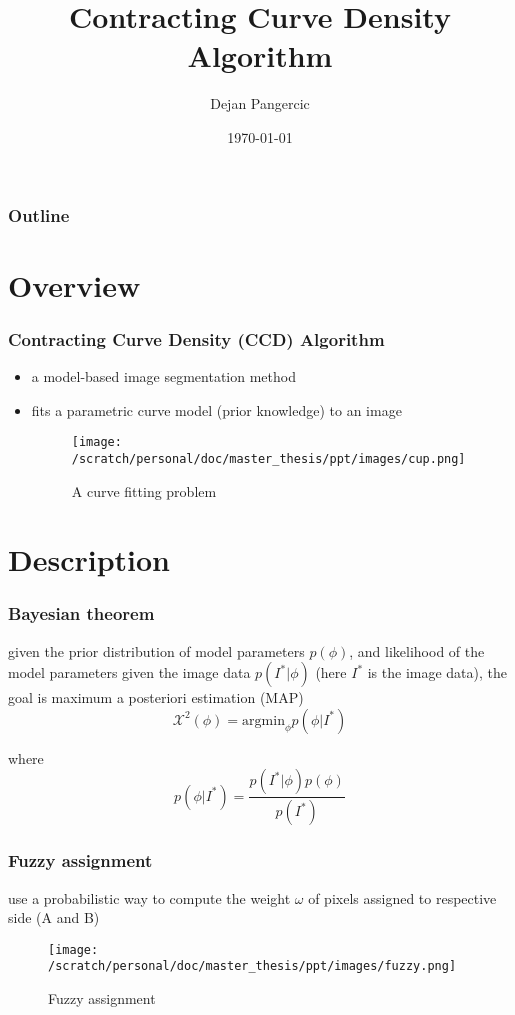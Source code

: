 \documentclass[english,10pt,presentation]{beamer}
\title{Contracting Curve Density Algorithm}
\author{Dejan Pangercic}
\date{\today}
\begin{document}
\maketitle

\begin{frame}
\frametitle{Outline}
\setcounter{tocdepth}{2}
\tableofcontents
\end{frame}

\section{Overview}
\label{sec-1}
\begin{frame}
\frametitle{Contracting Curve Density (CCD) Algorithm}
\label{sec-1_1}
\begin{itemize}

\item a model-based image segmentation method\\
\label{sec-1_1_1}%
\item fits a parametric curve model (prior knowledge) to an image\\
\label{sec-1_1_2}%
\begin{figure}[htb]
\centering
\texttt{[image: /scratch/personal/doc/master\_thesis/ppt/images/cup.png]}
\caption{\label{fig:1}A curve fitting problem}
\end{figure}

\end{itemize} %
\end{frame}
\section{Description}
\label{sec-2}
\begin{frame}
\frametitle{Bayesian theorem}
\label{sec-2_1}

    given the prior distribution of model parameters $p(\phi)$, and
    likelihood of the model parameters given the image data
    $p(I^*|\phi)$ (here $I^{*}$ is the image data), the goal is
    maximum a posteriori estimation (MAP)
\begin{displaymath}
\mathcal{X}^2(\phi) = \mathrm{argmin}_{\phi} p(\phi|I^*)
\end{displaymath}

where 
\begin{displaymath}
p(\phi|I^*) = \frac{p(I^*|\phi) p(\phi)}{p(I^{*})}
\end{displaymath}
\end{frame}
\begin{frame}
\frametitle{Fuzzy assignment}
\label{sec-2_2}

use a probabilistic way to compute the weight $\omega$ of pixels assigned to
respective side (A and B)
\begin{figure}[htb]
\centering
\texttt{[image: /scratch/personal/doc/master\_thesis/ppt/images/fuzzy.png]}
\caption{\label{fig:2}Fuzzy assignment}
\end{figure}
\end{frame}
\end{document}
